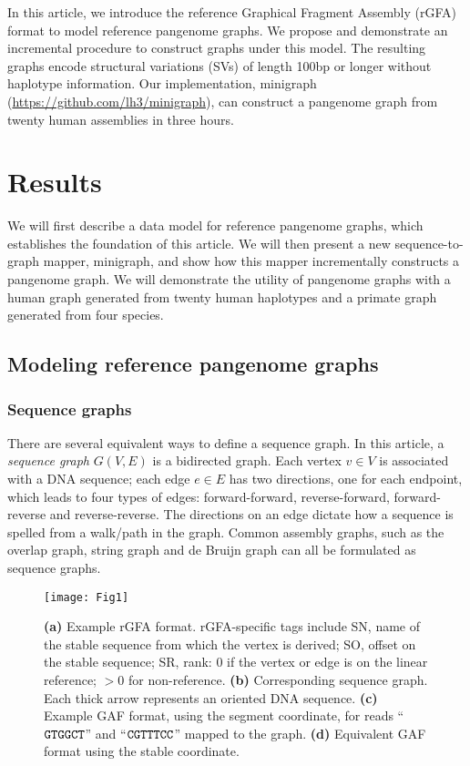 \documentclass[twocolumn]{bmcart}
\begin{document}
In this article, we introduce the reference Graphical Fragment Assembly (rGFA)
format to model reference pangenome graphs. We propose and demonstrate an
incremental procedure to construct graphs under this model. The resulting
graphs encode structural variations (SVs) of length 100bp or longer without haplotype
information.  Our implementation, minigraph~\cite{Li_minigraph:2020aa}
(\href{https://github.com/lh3/minigraph}{https://github.com/lh3/minigraph}),
can construct a pangenome graph from twenty human assemblies in three hours.

\section*{Results}

We will first describe a data model for reference pangenome graphs, which
establishes the foundation of this article. We will then present a new
sequence-to-graph mapper, minigraph, and show how this mapper incrementally
constructs a pangenome graph. We will demonstrate the utility of pangenome
graphs with a human graph generated from twenty human haplotypes and a primate
graph generated from four species.

\subsection*{Modeling reference pangenome graphs}

\subsubsection*{Sequence graphs}

There are several equivalent ways to define a sequence graph. In this article,
a \emph{sequence graph} $G(V,E)$ is a bidirected graph. Each vertex $v\in V$ is
associated with a DNA sequence; each edge $e\in E$ has two directions, one for
each endpoint, which leads to four types of edges: forward-forward,
reverse-forward, forward-reverse and reverse-reverse. The directions on an edge
dictate how a sequence is spelled from a walk/path in the graph. Common
assembly graphs, such as the overlap graph, string graph and de Bruijn graph
can all be formulated as sequence graphs.

\begin{figure}[t]
\texttt{[image: Fig1]}
\caption{ {\bf (a)} Example rGFA
  format. rGFA-specific tags include SN, name of the stable sequence from which
  the vertex is derived; SO, offset on the stable sequence; SR, rank: 0 if the
  vertex or edge is on the linear reference; $>$0 for non-reference.  {\bf (b)}
  Corresponding sequence graph. Each thick arrow represents an oriented DNA
  sequence. {\bf (c)} Example GAF format, using the segment coordinate, for
  reads ``${\tt GTGGCT}$'' and ``${\tt CGTTTCC}$'' mapped to the graph. {\bf
  (d)} Equivalent GAF format using the stable coordinate.}\label{fig:rgfa}
\end{figure}
\end{document}
